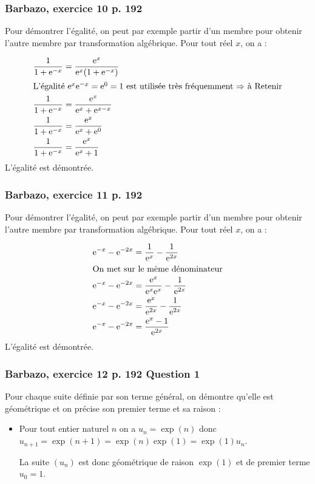 \documentclass[11pt, hyperref={urlcolor=red,%
            linkcolor=blue, %
            colorlinks=true}]{beamer}
\begin{document}
\begin{frame}
\frametitle{Barbazo, exercice 10 p. 192}
\label{exo10}

Pour démontrer l'égalité, on peut par exemple partir d'un membre pour obtenir l'autre membre par transformation algébrique. Pour tout réel $x$, on a :

\begin{align*}
	\frac{1}{1+\text{e}^{-x}} &=\frac{\text{e}^{x}}{\text{e}^{x}(1+\text{e}^{-x})} \\
	\intertext{L'égalité $\text{e}^{x}\text{e}^{-x}=\text{e}^{0}=1$ est utilisée très fréquemment $\Rightarrow$ à Retenir}
	\frac{1}{1+\text{e}^{-x}} &=\frac{\text{e}^{x}}{\text{e}^{x} +\text{e}^{x-x}} \\
	\frac{1}{1+\text{e}^{-x}} &=\frac{\text{e}^{x}}{\text{e}^{x} +\text{e}^{0}} \\
		\frac{1}{1+\text{e}^{-x}} &=\frac{\text{e}^{x}}{\text{e}^{x} +1}
\end{align*}
L'égalité est démontrée.


\end{frame}




\begin{frame}
\frametitle{Barbazo, exercice 11 p. 192}
\label{exo11}
Pour démontrer l'égalité, on peut par exemple partir d'un membre pour obtenir l'autre membre par transformation algébrique. Pour tout réel $x$, on a :

\begin{align*}
	\text{e}^{-x}-\text{e}^{-2x} &=\frac{1}{\text{e}^{x}} - \frac{1}{\text{e}^{2x}} \\
	\intertext{On met sur le même dénominateur}
\text{e}^{-x}-\text{e}^{-2x} &=\frac{\text{e}^{x}}{\text{e}^{x}\text{e}^{x}} - \frac{1}{\text{e}^{2x}}\\
		\text{e}^{-x}-\text{e}^{-2x} &=\frac{\text{e}^{x}}{\text{e}^{2x}} - \frac{1}{\text{e}^{2x}}\\
			\text{e}^{-x}-\text{e}^{-2x}&=\frac{\text{e}^{x}-1}{\text{e}^{2x}}
\end{align*}
L'égalité est démontrée.

\end{frame}


\begin{frame}
\frametitle{Barbazo, exercice 12 p. 192 Question 1}
\label{exo12}
Pour chaque suite définie par son terme général, on démontre qu'elle est géométrique et on précise son premier terme et sa raison :

\begin{itemize}
	\item Pour tout entier naturel $n$ on a $u_{n}=\exp(n)$ donc $u_{n+1}=\exp(n+1)=\exp(n)\exp(1)=\exp(1)u_{n}$.
	
	La suite $\left(u_{n}\right)$ est donc géométrique de raison $\exp(1)$ et de premier terme $u_{0}=1$.
	
	
	
\end{itemize}


\end{frame}
\end{document}
